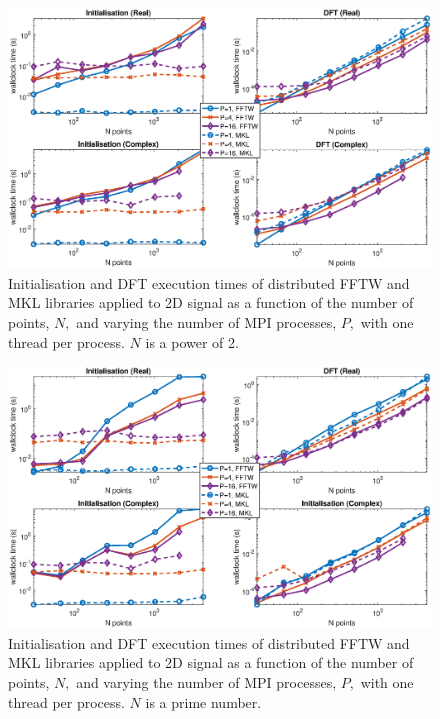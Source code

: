 \documentclass[a4paper]{article}
\begin{document}
\begin{figure}[htb]
    \centering
    \includegraphics[width=\linewidth]{../results/fftw_mkl_2_2d_mpi.eps}
  \caption{Initialisation and DFT execution times of distributed FFTW and MKL libraries applied to 2D signal as a function of the
    number of points, $N,$ and varying the number of MPI processes, $P,$ with one thread per process. $N$ is a power of 2.}
  \label{2DDistFFTWMKL2}
\end{figure}


\begin{figure}[htb]
    \centering
    \includegraphics[width=\linewidth]{../results/fftw_mkl_prime_2d_mpi.eps}
  \caption{Initialisation and DFT execution times of distributed FFTW and MKL libraries applied to 2D signal as a function of the
    number of points, $N,$ and varying the number of MPI processes, $P,$ with one thread per process. $N$ is a prime number.}
  \label{2DDistFFTWMKLprime}
\end{figure}
\end{document}
